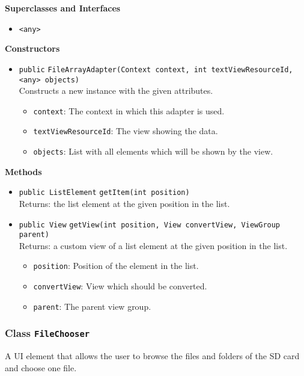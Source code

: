 \textbf{Superclasses and Interfaces}
\begin{itemize}
\item \lstinline|<any>|
\end{itemize}



\textbf{Constructors}
\begin{itemize}
\item \lstinline|public| \lstinline|FileArrayAdapter|\lstinline|(Context context, int textViewResourceId, <any> objects)|\\
Constructs a new instance with the given attributes.
\begin{itemize}
\item \lstinline|context|: The context in which this adapter is used.
\item \lstinline|textViewResourceId|: The view showing the data.
\item \lstinline|objects|: List with all elements which will be shown by the view.
\end{itemize}



\end{itemize}


\textbf{Methods}
\begin{itemize}
\item \lstinline|public ListElement| \lstinline|getItem|\lstinline|(int position)|\\
Returns: the list element at the given position in the list.



\item \lstinline|public View| \lstinline|getView|\lstinline|(int position, View convertView, ViewGroup parent)|\\
Returns: a custom view of a list element at the given position in the list.
\begin{itemize}
\item \lstinline|position|: Position of the element in the list.
\item \lstinline|convertView|: View which should be converted.
\item \lstinline|parent|: The parent view group.
\end{itemize}



\end{itemize}

\subsubsection{Class \lstinline|FileChooser|}
A UI element that allows the user to browse the files and folders of the SD card and
 choose one file. \\


